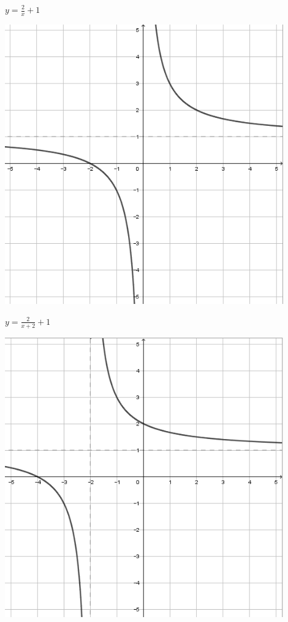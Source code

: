 \documentclass[a4paper]{oblivoir}
\begin{document}
\begin{minipage}{0.45\textwidth}\centering
\(y=\frac2x+1\)
\par\bigskip\includegraphics[width=0.9\textwidth]{img/4_rational_8}
\end{minipage}
\begin{minipage}{0.45\textwidth}\centering
\(y=\frac2{x+2}+1\)
\par\bigskip\includegraphics[width=0.9\textwidth]{img/4_rational_9}
\end{minipage}\bigskip\bigskip\par
\end{document}
